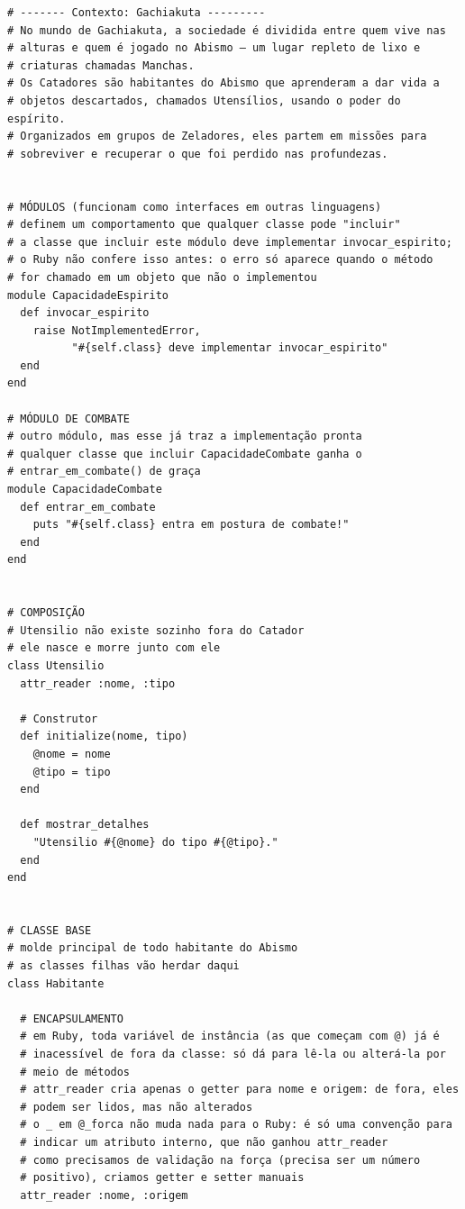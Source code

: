 \begin{lstlisting}[style=ruby, caption={Exemplo de Aplicação de POO em Ruby}]
# ------- Contexto: Gachiakuta ---------
# No mundo de Gachiakuta, a sociedade é dividida entre quem vive nas
# alturas e quem é jogado no Abismo — um lugar repleto de lixo e
# criaturas chamadas Manchas.
# Os Catadores são habitantes do Abismo que aprenderam a dar vida a
# objetos descartados, chamados Utensílios, usando o poder do espírito.
# Organizados em grupos de Zeladores, eles partem em missões para
# sobreviver e recuperar o que foi perdido nas profundezas.


# MÓDULOS (funcionam como interfaces em outras linguagens)
# definem um comportamento que qualquer classe pode "incluir"
# a classe que incluir este módulo deve implementar invocar_espirito;
# o Ruby não confere isso antes: o erro só aparece quando o método
# for chamado em um objeto que não o implementou
module CapacidadeEspirito
  def invocar_espirito
    raise NotImplementedError,
          "#{self.class} deve implementar invocar_espirito"
  end
end

# MÓDULO DE COMBATE
# outro módulo, mas esse já traz a implementação pronta
# qualquer classe que incluir CapacidadeCombate ganha o
# entrar_em_combate() de graça
module CapacidadeCombate
  def entrar_em_combate
    puts "#{self.class} entra em postura de combate!"
  end
end


# COMPOSIÇÃO
# Utensilio não existe sozinho fora do Catador
# ele nasce e morre junto com ele
class Utensilio
  attr_reader :nome, :tipo

  # Construtor
  def initialize(nome, tipo)
    @nome = nome
    @tipo = tipo
  end

  def mostrar_detalhes
    "Utensilio #{@nome} do tipo #{@tipo}."
  end
end


# CLASSE BASE
# molde principal de todo habitante do Abismo
# as classes filhas vão herdar daqui
class Habitante

  # ENCAPSULAMENTO
  # em Ruby, toda variável de instância (as que começam com @) já é
  # inacessível de fora da classe: só dá para lê-la ou alterá-la por
  # meio de métodos
  # attr_reader cria apenas o getter para nome e origem: de fora, eles
  # podem ser lidos, mas não alterados
  # o _ em @_forca não muda nada para o Ruby: é só uma convenção para
  # indicar um atributo interno, que não ganhou attr_reader
  # como precisamos de validação na força (precisa ser um número
  # positivo), criamos getter e setter manuais
  attr_reader :nome, :origem


\end{lstlisting}
